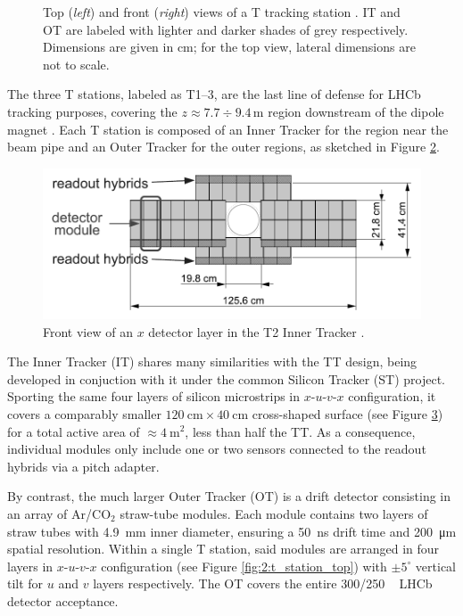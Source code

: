 \begin{figure}[t]
\begin{subfigure}{.45\textwidth}
		\caption{}
		\label{fig:2:t_station_front}
	\end{subfigure}
	\caption[Top and front views of a T tracking station.]{Top (\textit{left}) and front (\textit{right}) views of a T tracking station \cite{Barbosa-Marinho:582793}. IT and OT are labeled with lighter and darker shades of grey respectively. Dimensions are given in \si{\centi\meter}; for the top view, lateral dimensions are not to scale.}
	\label{fig:2:t_station}
\end{figure}

The three T stations, labeled as T1--3, are the last line of defense for LHCb tracking purposes, covering the $z \approx 7.7 \div 9.4\,\si{\meter}$ region downstream of the dipole magnet \cite{Barbosa-Marinho:582793}.
Each T station is composed of an Inner Tracker for the region near the beam pipe and an Outer Tracker for the outer regions, as sketched in Figure \ref{fig:2:t_station}.

\begin{figure}[t]
	\centering
	\includegraphics[width=.6\textwidth]{graphics/02-lhcb/it_layout.png}
	\caption[Front view of an Inner Tracker $x$ layer.]{Front view of an $x$ detector layer in the T2 Inner Tracker \cite{Alves:1129809}.}
	\label{fig:2:IT}
\end{figure}

The Inner Tracker (IT) \cite{Barbosa-Marinho:582793} shares many similarities with the TT design, being developed in conjuction with it under the common Silicon Tracker (ST) project.
Sporting the same four layers of silicon microstrips in $x$-$u$-$v$-$x$ configuration, it covers a comparably smaller $\SI{120}{\centi\meter} \times \SI{40}{\centi\meter}$ cross-shaped surface (see Figure \ref{fig:2:IT}) for a total active area of $\approx \SI{4}{\meter\squared}$, less than half the TT.
As a consequence, individual modules only include one or two sensors  connected to the readout hybrids via a pitch adapter.

By contrast, the much larger Outer Tracker (OT) \cite{Barbosa-Marinho:519146} is a drift detector consisting in an array of Ar/CO$_2$ straw-tube modules.
Each module contains two layers of straw tubes with \SI{4.9}{\milli\meter} inner diameter, ensuring a \SI{50}{\nano\second} drift time and \SI{200}{\micro\meter} spatial resolution.
Within a single T station, said modules are arranged in four layers in $x$-$u$-$v$-$x$ configuration (see Figure \ref{fig:2:t_station_top}) with $\pm 5^\circ$ vertical tilt for $u$ and $v$ layers respectively.
The OT covers the entire 300/250 \si{\milli\rad} LHCb detector acceptance.

